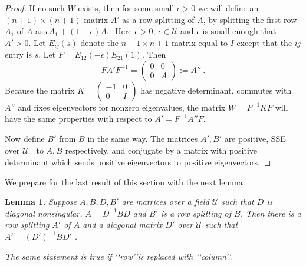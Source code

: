 \documentclass{amsart}
\newtheorem{lemma}[theorem]{Lemma}
\theoremstyle{definition}
\theoremstyle{remark}
\numberwithin{equation}{section}
\begin{document}
{{\begin{proof}
If no such $W$ exists, then for some small $\epsilon >0$ 
we will define an $(n+1)\times (n+1)$ matrix $A'$ 
as a row splitting of $A$, 
by splitting the first row $A_1$ of $A$ as 
$\epsilon A_1 + (1-\epsilon)A_1$. Here $\epsilon >0$, 
$\epsilon \in \mathcal U$ and $\epsilon$ is small enough 
that $ A'>0 $.  Let $E_{ij}(s)$ denote the $n+1\times n+1$ 
matrix equal to $I$ except that the $ij$ entry is $s$. 
Let $F=E_{12}(-\epsilon)E_{21}(1)$. Then 
\[
FA'F^{-1}= \begin{pmatrix} 0 & 0 \\ 0 & A \end{pmatrix} 
:= A'' \ . 
\] 
Because the matrix $K= \left(\begin{smallmatrix} -1 & 0 \\ 0 & I 
\end{smallmatrix}\right) $ 
has negative determinant, commutes with $A''$ and 
fixes eigenvectors for nonzero eigenvalues, the 
matrix $W=F^{-1}KF$ will have the same properties with respect to 
$A'=F^{-1}A''F$. 

Now define $B'$ from $B$ in the same way. The matrices $A',B'$ 
are positive, SSE over $\mathcal U_+$ to $A,B$ respectively, 
and conjugate by a matrix with positive determinant which sends 
positive eigenvectors to positive eigenvectors.  
\end{proof} 

We prepare for 
 the last result of this section 
with the next lemma. 

\begin{lemma} \label{zzzlemma} 
 Suppose $A,B,D,B'$ are  matrices 
over a field $\mathcal U$ such that $D$ is diagonal nonsingular,
 $A=D^{-1}BD$ and $B'$ is a row splitting of $B$. Then there is a 
row splitting $A'$ of $A$ and a diagonal matrix $D'$ over 
$\mathcal U$ such that 
 $A'=(D')^{-1}BD'$ .

The same statement is true if \lq\lq row\rq\rq is replaced with 
\lq\lq column\rq\rq .
\end{lemma}

}}
\end{document}
